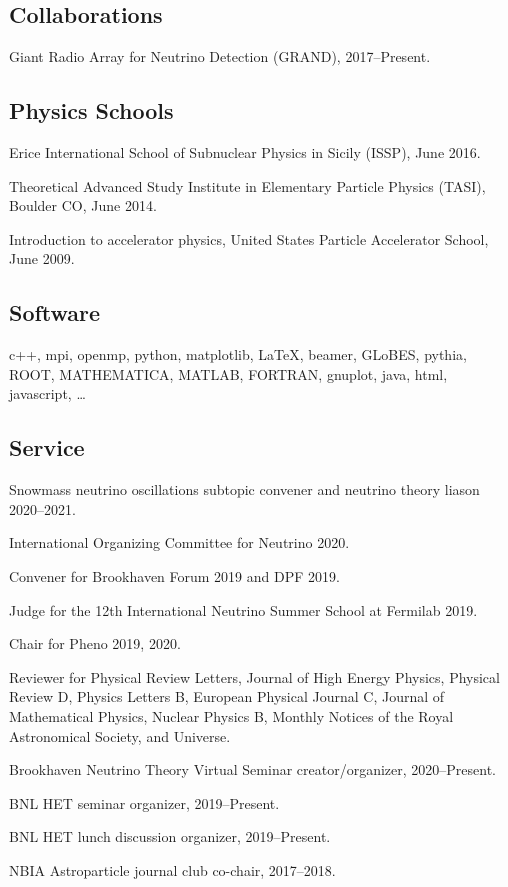 \documentclass{article}
\renewenvironment{itemize}{
\begin{list}{}{
\setlength{\leftmargin}{.5em}}}{
\end{list}}
\begin{document}
\subsection*{Collaborations}
\begin{itemize}
\item Giant Radio Array for Neutrino Detection (GRAND), 2017--Present.
\end{itemize}

\subsection*{Physics Schools}
\begin{itemize}
\item Erice International School of Subnuclear Physics in Sicily (ISSP), June 2016.
\item Theoretical Advanced Study Institute in Elementary Particle Physics (TASI), Boulder CO, June 2014.
\item Introduction to accelerator physics, United States Particle Accelerator School, June 2009.
\end{itemize}

\subsection*{Software}
\begin{itemize}
\item 
c++, mpi, openmp, python, matplotlib, \LaTeX, beamer, GLoBES, pythia, ROOT, MATHEMATICA, MATLAB, FORTRAN, gnuplot, java, html, javascript, \dots
\end{itemize}

\subsection*{Service}
\begin{itemize}
\item Snowmass neutrino oscillations subtopic convener and neutrino theory liason 2020--2021.
\item International Organizing Committee for Neutrino 2020.
\item Convener for Brookhaven Forum 2019 and DPF 2019.
\item Judge for the 12th International Neutrino Summer School at Fermilab 2019. 
\item Chair for Pheno 2019, 2020.
\item Reviewer for Physical Review Letters, Journal of High Energy Physics, Physical Review D, Physics Letters B, European Physical Journal C, Journal of Mathematical Physics, Nuclear Physics B, Monthly Notices of the Royal Astronomical Society, and Universe.
\item Brookhaven Neutrino Theory Virtual Seminar creator/organizer, 2020--Present.
\item BNL HET seminar organizer, 2019--Present.
\item BNL HET lunch discussion organizer, 2019--Present.
\item NBIA Astroparticle journal club co-chair, 2017--2018.
\end{itemize}
\end{document}
